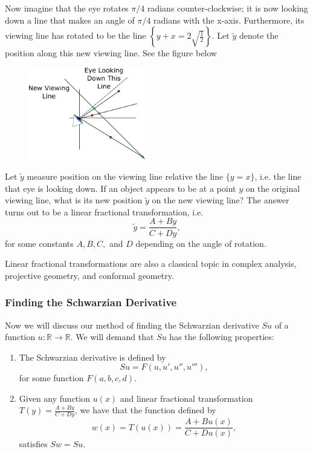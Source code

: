 Now imagine that the eye rotates \(\pi/4\) radians counter-clockwise; it is now looking down a line that makes
an angle of \(\pi/4\) radians with the x-axis. Furthermore, its viewing line has rotated to be the 
line \(\left\{y + x = 2\sqrt{\frac{1}{2}} \right\}\). Let \(\tilde y\) denote the position along this 
new viewing line. See the figure below

\begin{figure}[h]
\centering
\includegraphics[width = 2in]{oneVarDiffCalc/perspective2.pdf}
\end{figure}

Let \(\tilde y\) measure position on the viewing line relative the line \(\{y = x\}\), i.e. the line that eye is
looking down. If an object appears to be at a point \(y\) on the original viewing line, what is its new position \(\tilde y\) on 
the new viewing line?
The answer turns out to be a linear fractional transformation, i.e.
\begin{equation}
\tilde y = \frac{A + By}{C + Dy},
\end{equation} 
for some constants \(A, B, C,\) and \(D\) depending on the angle of rotation.

Linear fractional transformations are also a classical topic in complex analysis, projective geometry, and
conformal geometry.

\subsubsection*{Finding the Schwarzian Derivative}

Now we will discuss our method of finding the Schwarzian derivative \(Su\) of a function \(u: \mathbb R \to 
\mathbb R\). We will demand that \(Su\) has the following properties:

\begin{enumerate}
\item The Schwarzian derivative is defined by
\begin{equation}
Su = F(u, u', u'', u'''),
\end{equation}
for some function \(F(a, b, c, d)\).

\item Given any function \(u(x)\) and linear fractional transformation \(T(y) = \frac{A + By}{C + Dy}\), we have
that the function defined by
\begin{equation}
w(x) = T(u(x)) = \frac{A + Bu(x)} {C + Du(x)},
\end{equation}
satisfies \(Sw = Su\).
\end{enumerate}

